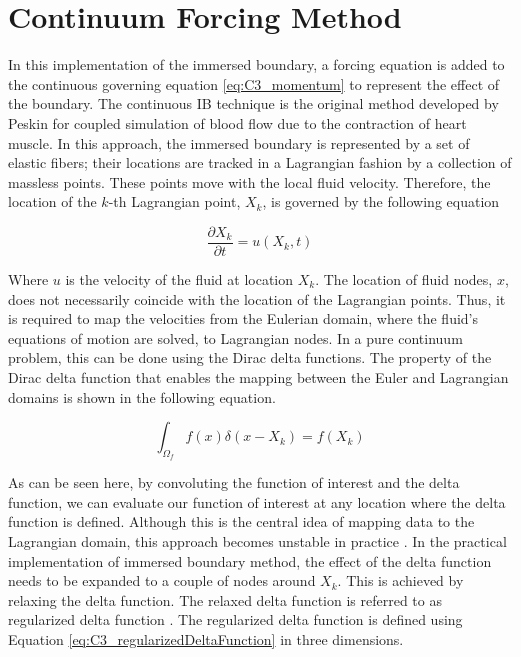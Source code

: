 \section{Continuum Forcing Method}
In this implementation of the immersed boundary, a forcing equation is added to the continuous governing equation \eqref{eq:C3_momentum} to represent the effect of the boundary. The continuous IB technique is the original method developed by Peskin \cite{peskin1972flow} for coupled simulation of blood flow due to the contraction of heart muscle. In this approach, the immersed boundary is represented by a set of elastic fibers; their locations are tracked in a Lagrangian fashion by a collection of massless points. These points move with the local fluid velocity. Therefore, the location of the $k$-th Lagrangian point, $X_k$, is governed by the following equation

\begin{equation}
    \frac{\partial X_k}{\partial t} = u(X_k, t)
\end{equation}

Where $u$ is the velocity of the fluid at location $X_k$. The location of fluid nodes, $x$, does not necessarily coincide with the location of the Lagrangian points. Thus, it is required to map the velocities from the Eulerian domain, where the fluid's equations of motion are solved, to Lagrangian nodes. In a pure continuum problem, this can be done using the Dirac delta functions. The property of the Dirac delta function that enables the mapping between the Euler and Lagrangian domains is shown in the following equation.

\begin{equation}
    \int_{\Omega_f} f(x) \delta(x - X_k) = f(X_k)
\end{equation}

As can be seen here, by convoluting the function of interest and the delta function, we can evaluate our function of interest at any location where the delta function is defined. Although this is the central idea of mapping data to the Lagrangian domain, this approach becomes unstable in practice \cite{lee2003stability}. In the practical implementation of immersed boundary method, the effect of the delta function needs to be expanded to a couple of nodes around $X_k$. This is achieved by relaxing the delta function. The relaxed delta function is referred to as regularized delta function \cite{shin2008assessment}. The regularized delta function is defined using Equation \eqref{eq:C3_regularizedDeltaFunction} in three dimensions.

